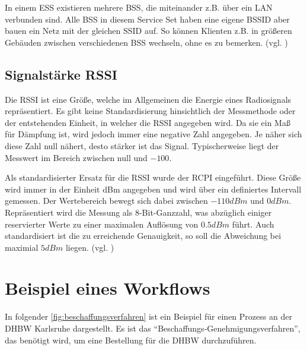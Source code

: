 In einem \gls{ESS} existieren mehrere \gls{BSS}, die miteinander z.B. über ein \gls{LAN} verbunden sind.
Alle \gls{BSS} in diesem Service Set haben eine eigene \gls{BSSID} aber bauen ein Netz mit der gleichen \gls{SSID} auf.
So können Klienten z.B. in größeren Gebäuden zwischen verschiedenen \gls{BSS} wechseln, ohne es zu bemerken.
(vgl. \cite{Haider2019})

\subsection{Signalstärke \gls{RSSI}}

Die \gls{RSSI} ist eine Größe, welche im Allgemeinen die Energie eines Radiosignals repräsentiert.
Es gibt keine Standardisierung hinsichtlich der Messmethode oder der entstehenden Einheit, in
welcher die \gls{RSSI} angegeben wird. Da sie ein Maß für Dämpfung ist, wird jedoch immer eine
negative Zahl angegeben. Je näher sich diese Zahl null nähert, desto stärker ist das Signal.
Typischerweise liegt der Messwert im Bereich zwischen null und $-100$.

Als standardisierter Ersatz für die \gls{RSSI} wurde der \gls{RCPI} eingeführt. Diese Größe wird
immer in der Einheit dBm angegeben und wird über ein definiertes Intervall gemessen. Der
Wertebereich bewegt sich dabei zwischen $-110 dBm$ und $0 dBm$. Repräsentiert wird die Messung als
8-Bit-Ganzzahl, was abzüglich einiger reservierter Werte zu einer maximalen Auflösung von $0.5 dBm$
führt. Auch standardisiert ist die zu erreichende Genauigkeit, so soll die Abweichung bei maximial
$5 dBm$ liegen. (vgl. \cite{IEEE802.11-2012})

\section{Beispiel eines Workflows}

In folgender \autoref{fig:beschaffungsverfahren} ist ein Beispiel für einen Prozess an der \gls{DHBW} Karlsruhe dargestellt.
Es ist das \enquote{Beschaffungs-Genehmigungsverfahren}, das benötigt wird, um eine Bestellung für die \gls{DHBW} durchzuführen.

